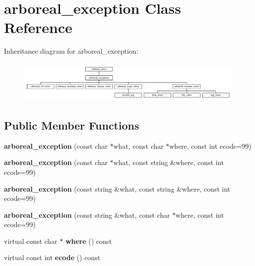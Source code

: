 \hypertarget{classarboreal__exception}{}\section{arboreal\+\_\+exception Class Reference}
\label{classarboreal__exception}
Inheritance diagram for arboreal\+\_\+exception\+:\begin{figure}[H]
\begin{center}
\leavevmode
\includegraphics[height=2.064516cm]{classarboreal__exception}
\end{center}
\end{figure}
\subsection*{Public Member Functions}
\begin{DoxyCompactItemize}
\item 
\mbox{\label{classarboreal__exception_a11dbf1da86d3d2b3cfee2f3aeb80117b}} 
{\bfseries arboreal\+\_\+exception} (const char $\ast$what, const char $\ast$where, const int ecode=99)
\item 
\mbox{\label{classarboreal__exception_aa5a71af74c46ffa83716fcdfdb6890e5}} 
{\bfseries arboreal\+\_\+exception} (const char $\ast$what, const string \&where, const int ecode=99)
\item 
\mbox{\label{classarboreal__exception_aa5b64424f94fda27c5a4f48a36a3cb8d}} 
{\bfseries arboreal\+\_\+exception} (const string \&what, const string \&where, const int ecode=99)
\item 
\mbox{\label{classarboreal__exception_a0a289978d3da4e38cae543c936ddc176}} 
{\bfseries arboreal\+\_\+exception} (const string \&what, const char $\ast$where, const int ecode=99)
\item 
\mbox{\label{classarboreal__exception_a802003dee586aaeb0b0d7ce909da2dad}} 
virtual const char $\ast$ {\bfseries where} () const
\item 
\mbox{\label{classarboreal__exception_a318e716601c544d92ff9af25edebd725}} 
virtual const int {\bfseries ecode} () const
\end{DoxyCompactItemize}

